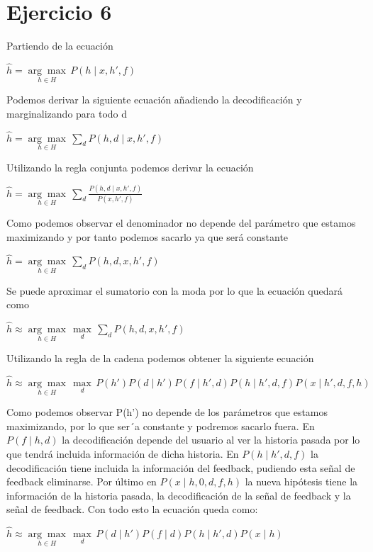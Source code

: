\documentclass[10pt,a4paper]{article}
\begin{document}
	\section{Ejercicio 6}
	Partiendo de la ecuación
	\begin{center}
		${\hat{h} = \underset{h \in H}{\arg\max}\,
			{P(h \mid x,h',f)}}$
	\end{center}
	Podemos derivar la siguiente ecuación añadiendo la decodificación y marginalizando para todo d
	\begin{center}
		${\hat{h} = \underset{h \in H}{\arg\max}\,
			\underset{d}{\sum}{P(h,d \mid x,h',f)}}$
	\end{center}
	Utilizando la regla conjunta podemos derivar la ecuación
	\begin{center}
		${\hat{h} = \underset{h \in H}{\arg\max}\,
			\underset{d}{\sum}{\frac{P(h,d \mid x,h',f)}{P(x,h',f)}}}$
	\end{center}
	Como podemos observar el denominador no depende del parámetro que estamos
	maximizando y por tanto podemos sacarlo ya que será constante
	\begin{center}
		${\hat{h} = \underset{h \in H}{\arg\max}\,
			\underset{d}{\sum}{P(h,d, x,h',f)}}$
	\end{center}
	Se puede aproximar el sumatorio con la moda por lo que la ecuación quedará
	como
	\begin{center}
		${\hat{h} \approx \underset{h \in H}{\arg\max}\,
			\underset{d}{\max}\,
			\underset{d}{\sum}{P(h,d, x,h',f)}}$
	\end{center}
	Utilizando la regla de la cadena podemos obtener la siguiente ecuación
	\begin{center}
		$\hat{h} \approx \underset{h \in H}{\arg\max}\,
			\underset{d}{\max}\,
			P(h')P(d \mid h')P(f \mid h',d)
				P(h \mid h',d,f)P(x \mid h',d,f,h)$
	\end{center}
	Como podemos observar P(h’) no depende de los parámetros que estamos maximizando, por lo que ser´a constante y podremos sacarlo fuera.
	En $P(f \mid h,d)$ la decodificación depende del usuario al ver la historia pasada por lo que tendrá incluida información de dicha historia.
	En $P(h \mid h',d,f)$ la decodificación tiene incluida la información del feedback, pudiendo esta señal de feedback eliminarse.
	Por último en $P(x \mid h,0,d,f,h)$ la nueva hipótesis tiene la información de la historia pasada, la decodificación de la señal de feedback y la señal de feedback. Con todo esto la ecuación queda como:
	\begin{center}
		${\hat{h} \approx \underset{h \in H}{\arg\max}\,
			\underset{d}{\max}\,
			P(d \mid h')P(f \mid d)
				P(h \mid h',d)P(x \mid h)}$
	\end{center}
\end{document}
